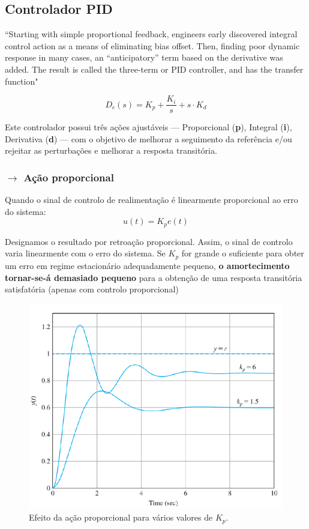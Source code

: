 \newpage
\subsection[3.4 Controlador PID]{\hspace*{0.075 em}\raisebox{0.2 em}{$\pmb{\drsh}$} Controlador PID}

\noindent ``Starting with simple proportional feedback, engineers early discovered integral control action as a means of eliminating bias offset. Then, finding poor dynamic response in many cases, an “anticipatory” term based on the derivative was added. The result is called the three-term or PID controller, and has the transfer function"\cite{FranklinPowell2015}

$$
    \boxed{D_c(s) = K_p + \dfrac{K_i}{s} + s \cdot K_d}
$$

\noindent Este controlador possui três ações ajustáveis --- Proporcional (\textbf{p}), Integral (\textbf{i}), Derivativa (\textbf{d}) --- com o objetivo de  melhorar a seguimento da referência e/ou rejeitar as perturbações e melhorar a resposta transitória.

\subsubsection[3.4.1 Ação proporcional]{$\pmb{\rightarrow}$ Ação proporcional}
\noindent Quando o sinal de controlo de realimentação é linearmente proporcional ao erro do sistema:
$$
    u(t) = K_p e(t)
$$

\noindent Designamos o resultado por retroação proporcional. Assim, o sinal de controlo varia linearmente com o erro do sistema. Se $K_p$ for grande o suficiente para obter um erro em regime estacionário adequadamente pequeno, \textbf{o amortecimento tornar-se-á demasiado pequeno} para a obtenção de uma resposta transitória satisfatória (apenas com controlo proporcional)

\begin{figure}[H]
    \centering
    \includegraphics[width = 0.5\linewidth]{img/3/proportional-control.png}
    \caption{Efeito da ação proporcional para vários valores de $K_p$.}
    \label{fig:proportional-control}
\end{figure}

